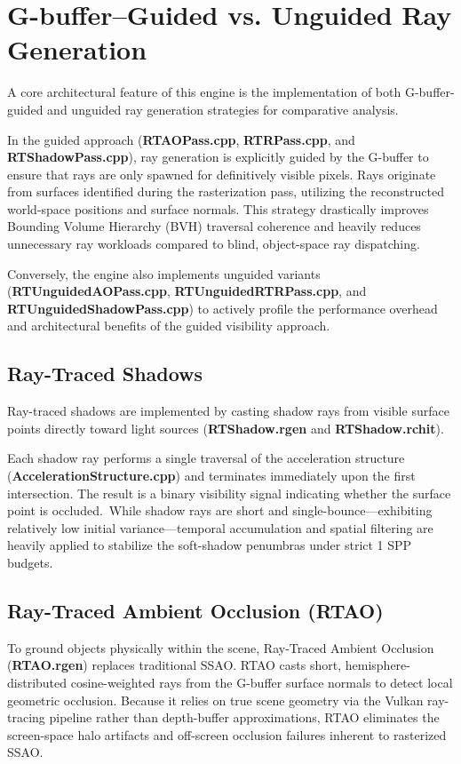 \documentclass[12pt,a4paper]{report}
\newcommand{\daesection}[1]{
  \section{#1}
}
\begin{document}
\daesection{ G-buffer–Guided vs. Unguided Ray Generation}
A core architectural feature of this engine is the implementation of both G-buffer-guided and unguided ray generation strategies for comparative analysis.

In the guided approach (\textbf{RTAOPass.cpp}, \textbf{RTRPass.cpp}, and \textbf{RTShadowPass.cpp}), ray generation is explicitly guided by the G-buffer to ensure that rays are only spawned for definitively visible pixels.
Rays originate from surfaces identified during the rasterization pass, utilizing the reconstructed world-space positions and surface normals.
This strategy drastically improves Bounding Volume Hierarchy (BVH) traversal coherence and heavily reduces unnecessary ray workloads compared to blind, object-space ray dispatching.

Conversely, the engine also implements unguided variants (\textbf{RTUnguidedAOPass.cpp}, \textbf{RTUnguidedRTRPass.cpp}, and \textbf{RTUnguidedShadowPass.cpp}) to actively profile the performance overhead and architectural benefits of the guided visibility approach.
\subsection{Ray-Traced Shadows}
Ray-traced shadows are implemented by casting shadow rays from visible surface points directly toward light sources (\textbf{RTShadow.rgen} and \textbf{RTShadow.rchit}).

Each shadow ray performs a single traversal of the acceleration structure (\textbf{AccelerationStructure.cpp}) and terminates immediately upon the first intersection. The result is a binary visibility signal indicating whether the surface point is occluded.\
While shadow rays are short and single-bounce—exhibiting relatively low initial variance—temporal accumulation and spatial filtering are heavily applied to stabilize the soft-shadow penumbras under strict 1 SPP budgets.
\newpage
\subsection{Ray-Traced Ambient Occlusion (RTAO)}
To ground objects physically within the scene, Ray-Traced Ambient Occlusion (\textbf{RTAO.rgen}) replaces traditional SSAO. RTAO casts short, hemisphere-distributed cosine-weighted rays from the G-buffer surface normals to detect local geometric occlusion.
Because it relies on true scene geometry via the Vulkan ray-tracing pipeline rather than depth-buffer approximations, RTAO eliminates the screen-space halo artifacts and off-screen occlusion failures inherent to rasterized SSAO.
\end{document}

